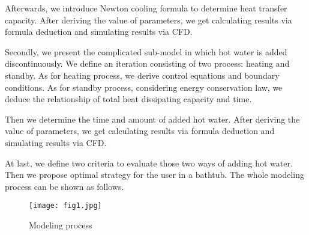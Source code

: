 \documentclass{mcmthesis}
\begin{document}
Afterwards, we introduce Newton cooling formula to determine heat transfer
capacity. After deriving the value of parameters, we get calculating results via formula deduction and simulating results via CFD.

Secondly, we present the complicated sub-model in which hot water is
added discontinuously. We define an iteration consisting of two process:
heating and standby. As for heating process, we derive control equations and boundary conditions. As for standby process, considering energy conservation law, we deduce the relationship of total heat dissipating capacity and time.

Then we determine the time and amount of added hot water. After deriving the value of parameters, we get calculating results via formula deduction and simulating results via CFD.

At last, we define two criteria to evaluate those two ways of adding hot water. Then we propose optimal strategy for the user in a bathtub.
The whole modeling process can be shown as follows.

\begin{figure}[h] 
\centering
\texttt{[image: fig1.jpg]}
\caption{Modeling process} \label{fig1}
\end{figure}
\end{document}
